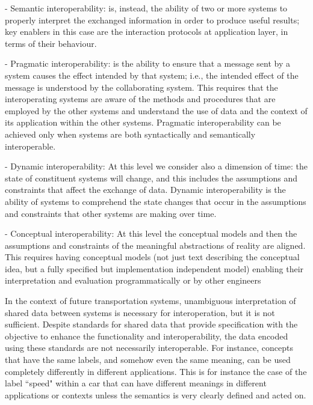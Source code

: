  - Semantic interoperability: is, instead, the ability of two or more systems to properly interpret the exchanged information in order to produce useful results; key enablers in this case are the interaction protocols at application layer, in terms of their behaviour.

 - Pragmatic interoperability: is the ability to ensure that a message sent by a system causes the effect intended by that system; i.e., the intended effect of the message is understood by the collaborating system. This requires that the interoperating systems are aware of the methods and procedures that are employed by the other systems and understand the use of data and the context of its application within the other systems. Pragmatic interoperability can be achieved only when systems are both syntactically and semantically interoperable.

 - Dynamic interoperability: At this level we consider also a dimension of time: the state of constituent systems will change, and this includes the assumptions and constraints that affect the exchange of data. Dynamic interoperability is the ability of systems to comprehend the state changes that occur in the assumptions and constraints that other systems are making over time.

 - Conceptual interoperability: At this level the conceptual models and then the assumptions and constraints of the meaningful abstractions of reality are aligned.
This requires having conceptual models (not just text describing the conceptual idea, but a fully specified but implementation independent model) enabling their interpretation and evaluation programmatically or by other engineers

In the context of future transportation systems, unambiguous interpretation of shared data between systems is necessary for interoperation, but it is not sufficient. Despite standards for shared data that provide specification with the objective to enhance the functionality and interoperability, the data encoded using these standards are not necessarily interoperable. For instance, concepts that have the same labels, and somehow even the same meaning, can be used completely differently in different applications. This is for instance the case of the label ``speed" within a car that can have different meanings in different applications or contexts unless the semantics is very clearly defined and acted on.
%


